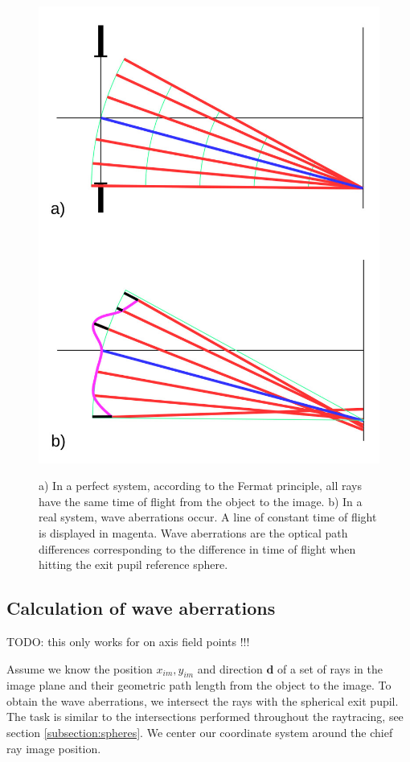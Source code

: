 \documentclass[12pt,a4paper,twoside,openright,BCOR10mm,headsepline,titlepage,abstracton,chapterprefix,final]{scrreprt}
\newcommand\Vector[1]{{\mathbf{#1}}}
\begin{document}
\begin{figure}
  \centering
  \includegraphics[width=0.5\columnwidth]{waveaberrations}\\
  \caption{a) In a perfect system, according to the Fermat principle, all rays have the same time of flight from the object to the image. b) In a real system, wave aberrations occur. A line of constant time of flight is displayed in magenta.
  Wave aberrations are the optical path differences corresponding to the difference in time of flight when hitting the exit pupil reference sphere.}
  \label{fig:waveaberrations}
\end{figure}

\subsection{Calculation of wave aberrations}
TODO: this only works for on axis field points !!!

Assume we know the position $x_{im}, y_{im}$ and direction $\Vector{d}$ of a set of rays in the image plane and their geometric path length from the object to the image.
To obtain the wave aberrations, we intersect the rays with the spherical exit pupil.
The task is similar to the intersections performed throughout the raytracing, see section \ref{subsection:spheres}.
We center our coordinate system around the chief ray image position.
\end{document}
